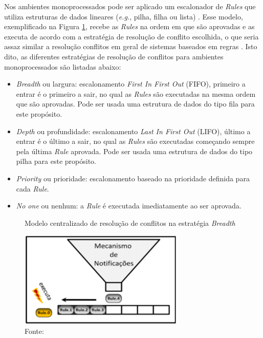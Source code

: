 Nos ambientes monoprocessados pode ser aplicado um escalonador de \textit{Rules}
que utiliza estruturas de dados lineares (\textit{e.g.}, pilha, filha ou lista)
\cite{msc_Banaszewski_2009}. Esse modelo, exemplificado na Figura
\ref{fig:conflitos}, recebe as \textit{Rules} na ordem em que são aprovadas e as
executa de acordo com a estratégia de resolução de conflito escolhida, o que
seria assaz similar a resolução conflitos em geral de sistemas baseados em
regras \cite{msc_Banaszewski_2009}. Isto dito, as diferentes estratégias de
resolução de conflitos para ambientes monoprocessados são listadas abaixo:

\begin{itemize}
  \item \textit{Breadth} ou largura: escalonamento \textit{First In First Out}
        (FIFO), primeiro a entrar é o primeiro a sair, no qual as \textit{Rules}
        são executadas na mesma ordem que são aprovadas. Pode ser usada uma
        estrutura de dados do tipo fila para este propósito.
  \item \textit{Depth} ou profundidade: escalonamento \textit{Last In First Out}
        (LIFO), último a entrar é o último a sair, no qual as \textit{Rules}
        são executadas começando sempre pela última \textit{Rule} aprovada. Pode
        ser usada uma estrutura de dados do tipo pilha para este propósito.
  \item \textit{Priority} ou prioridade: escalonamento baseado na prioridade definida para
        cada \textit{Rule}.
  \item \textit{No one} ou nenhum: a \textit{Rule} é executada imediatamente ao ser
        aprovada.
\end{itemize}

\begin{figure}[!htb]
  \centering
  \caption{Modelo centralizado de resolução de conflitos na estratégia
    \textit{Breadth}} \includegraphics[width=0.7\textwidth]{../figures/conflitos.png}
  \smallskip
  \caption*{Fonte: }
  \label{fig:conflitos}
\end{figure}

